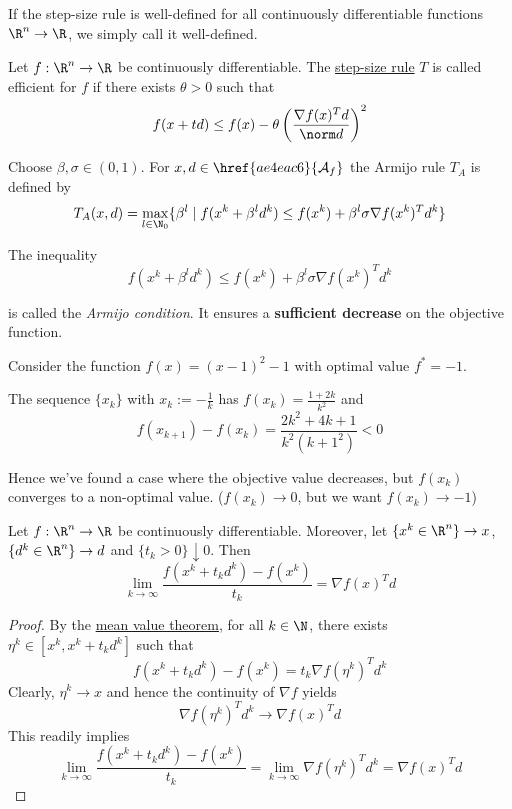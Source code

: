 If the step-size rule is well-defined for all continuously
differentiable functions ${\R}^n\to{\R}$, we simply call it
well-defined.

\label{d23fdf0}

Let $f:\R^n\to\R$ be continuously differentiable. The
\href{ae4eac6}{step-size rule} $T$ is called efficient for $f$ if
there exists $\theta>0$ such that
$$
	f(x+td)\leq f(x)-\theta\left(\frac{\nabla f(x)^Td}{\norm d}\right)^2
$$

\label{fefb024}

Choose $\beta,\sigma\in(0,1)$. For $x,d\in\href{ae4eac6}{\mathcal
		A_f}$ the Armijo rule $T_A$ is defined by
$$
	T_A(x,d)=\max_{l\in\N_0}\{\beta^l\mid f(x^k+\beta^ld^k)\leq
	f(x^k)+\beta^l\sigma\nabla f(x^k)^Td^k\}
$$

The inequality
$$
	f(x^k+\beta^ld^k)\leq f(x^k)+\beta^l\sigma\nabla f(x^k)^Td^k
$$

is called the \textit{Armijo condition}. It ensures a
\textbf{sufficient decrease} on the objective function.

\label{ae7f42d}

Consider the function $f(x)=(x-1)^2-1$ with optimal value $f^*=-1$.

The sequence $\{x_k\}$ with $x_k:=-\frac1k$ has
$f(x_k)=\frac{1+2k}{k^2}$ and
$$
	f(x_{k+1})-f(x_k)=\frac{2k^2+4k+1}{k^2(k+1^2)}<0
$$

Hence we've found a case where the objective value decreases, but
$f(x_k)$ converges to a non-optimal value. ($f(x_k)\to0$, but we want
$f(x_k)\to-1$)

\label{f8e1f12}

Let $f:\R^n\to\R$ be continuously differentiable. Moreover, let
$\{x^k\in\R^n\}\to x$, $\{d^k\in\R^n\}\to d$ and
$\{t_k>0\}\downarrow0$. Then
$$
	\lim_{k\to\infty}\frac{f(x^k+t_kd^k)-f(x^k)}{t_k}=\nabla f(x)^Td
$$

\begin{proof}
	By the \href{d37aa2b}{mean value theorem}, for all $k\in\N$, there
	exists $\eta^k\in[x^k,x^k+t_kd^k]$ such that
	$$
		f(x^k+t_kd^k)-f(x^k)=t_k\nabla f(\eta^k)^Td^k
	$$
	Clearly, $\eta^k\to x$ and hence the continuity of $\nabla f$ yields
	$$
		\nabla f(\eta^k)^Td^k\to\nabla f(x)^Td
	$$
	This readily implies
	$$
		\lim_{k\to\infty}\frac{f(x^k+t_kd^k)-f(x^k)}{t_k}=
		\lim_{k\to\infty}\nabla f(\eta^k)^Td^k=
		\nabla f(x)^Td
	$$
\end{proof}

